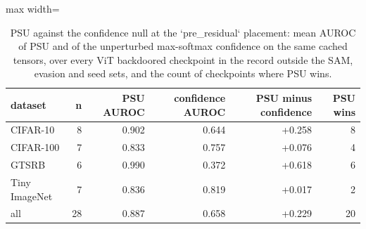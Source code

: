 \begin{table}[htbp]
\centering
\small
\caption{PSU against the confidence null at the `pre_residual` placement: mean AUROC of PSU and of the unperturbed max-softmax confidence on the same cached tensors, over every ViT backdoored checkpoint in the record outside the SAM, evasion and seed sets, and the count of checkpoints where PSU wins.}
\label{tab:confidence-null}
\begin{adjustbox}{max width=\linewidth}
\begin{tabular}{lrrrrr}
\toprule
dataset & n & PSU AUROC & confidence AUROC & PSU minus confidence & PSU wins \\
\midrule
CIFAR-10 & 8 & 0.902 & 0.644 & +0.258 & 8 \\
CIFAR-100 & 7 & 0.833 & 0.757 & +0.076 & 4 \\
GTSRB & 6 & 0.990 & 0.372 & +0.618 & 6 \\
Tiny ImageNet & 7 & 0.836 & 0.819 & +0.017 & 2 \\
all & 28 & 0.887 & 0.658 & +0.229 & 20 \\
\bottomrule
\end{tabular}
\end{adjustbox}
\end{table}
